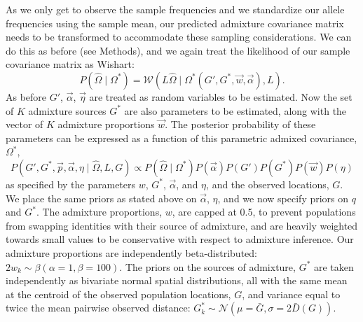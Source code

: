 \documentclass[12pt]{article}
\newcommand{\identifyadmixsource}[1]{{#1^{*}}}
\begin{document}
As we only get to observe the sample frequencies and we standardize our allele frequencies using the sample mean, our predicted admixture covariance matrix needs to be transformed to accommodate these sampling considerations. We can do this as before (see Methods), and we again treat the likelihood of our sample covariance matrix as Wishart:
\begin{equation}
\label{eq:wishart_dist_admixed}
P(\widehat{\Omega} \mid \identifyadmixsource{\Omega}) = 
	\mathcal{W}\left(L \widehat{\Omega} \mid \identifyadmixsource{\Omega} \left( G',\identifyadmixsource{G}, \vec{w},\vec{\alpha}\right),L \right)	\text{.}
\end{equation}
As before $G'$, $\vec{\alpha}$, $\vec{\eta}$ are treated as random variables to be estimated. Now the set of $K$ admixture sources $\identifyadmixsource{G}$ are also parameters to be estimated, along with the vector of $K$ admixture proportions $\vec{w}$. The posterior probability of these parameters can be expressed as a function of this parametric admixed covariance, $\identifyadmixsource{\Omega}$,
\begin{equation}
\label{eq:admixed_post_prob}
P(G',\identifyadmixsource{G}, \vec{p},\vec{\alpha}, \eta \mid \widehat{\Omega}, L,G) 
	\propto  
		P(\widehat{\Omega}  \mid \identifyadmixsource{\Omega}) P(\vec{\alpha}) P(G') P(\identifyadmixsource{G}) P(\vec{w}) P(\eta) 
\end{equation}
%
as specified by the parameters $w$, $\identifyadmixsource{G}$, $\vec{\alpha}$, and $\eta$, and the observed locations, $G$.  We place the same priors as stated above on $\vec{\alpha}$, $\eta$, and we now specify priors on $q$ and $\identifyadmixsource{G}$.  The admixture proportions, $w$, are capped at 0.5, to prevent populations from swapping identities with their source of admixture, and are heavily weighted towards small values to be conservative with respect to admixture inference.  Our admixture proportions are independently beta-distributed: $2 w_k \sim \beta(\alpha = 1,\beta = 100)$.  The priors on the sources of admixture, $\identifyadmixsource{G}$ are taken independently as bivariate normal spatial distributions, all with the same mean at the centroid of the observed population locations, $G$, and variance equal to twice the mean pairwise observed distance:  $\identifyadmixsource{G_k} \sim \mathcal{N}(\mu = \bar{G},\sigma = 2 \bar{D}(G))$.
\end{document}

